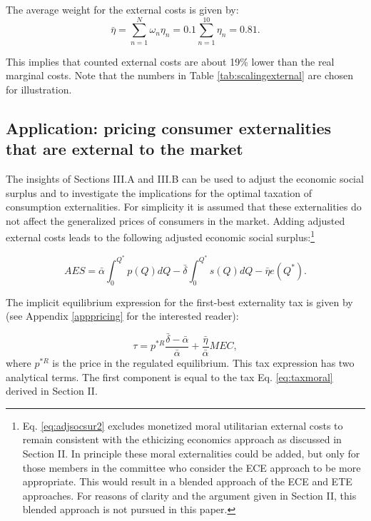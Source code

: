 \documentclass[
]{book}
\begin{document}
The average weight for the external costs is given by:
\begin{equation}
 \bar{\eta} = \sum_{n=1}^N \omega_n \eta_n = 0.1 \sum_{n=1}^{10} \eta_n = 0.81.
\end{equation}

This implies that counted external costs are about 19\% lower than the real marginal costs. Note that the numbers in Table \ref{tab:scalingexternal} are chosen for illustration.

\hypertarget{application-pricing-consumer-externalities-that-are-external-to-the-market}{%
\subsection{Application: pricing consumer externalities that are external to the market}\label{application-pricing-consumer-externalities-that-are-external-to-the-market}}

The insights of Sections III.A and III.B can be used to adjust the economic social surplus and to investigate the implications for the optimal taxation of consumption externalities. For simplicity it is assumed that these externalities do not affect the generalized prices of consumers in the market. Adding adjusted external costs leads to the following adjusted economic social surplus:\footnote{Eq. \eqref{eq:adjsocsur2} excludes monetized moral utilitarian external costs to remain consistent with the ethicizing economics approach as discussed in Section II. In principle these moral externalities could be added, but only for those members in the committee who consider the ECE approach to be more appropriate. This would result in a blended approach of the ECE and ETE approaches. For reasons of clarity and the argument given in Section II, this blended approach is not pursued in this paper.}

\begin{equation}
  AES = \bar{\alpha} \int_0^{Q^*} p(Q)dQ - \bar{\delta} \int_0^{Q^*} s(Q) dQ - \bar{\eta} e(Q^*).
  \label{eq:adjsocsur2}
\end{equation}

The implicit equilibrium expression for the first-best externality tax is given by (see Appendix \ref{apppricing} for the interested reader):

\begin{equation}
 \tau = p^{*R} \frac{\bar{\delta} - \bar{\alpha}}{\bar{\alpha}} + \frac{\bar{\eta}}{\bar{\alpha}}MEC,
   \label{eq:taxmoral2}
\end{equation}
where \(p^{*R}\) is the price in the regulated equilibrium. This tax expression has two analytical terms. The first component is equal to the tax Eq. \eqref{eq:taxmoral} derived in Section II.
\end{document}
